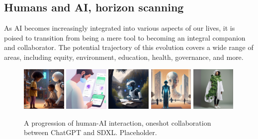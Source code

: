 \subsection{Humans and AI, horizon scanning}
As AI becomes increasingly integrated into various aspects of our lives, it is poised to transition from being a mere tool to becoming an integral companion and collaborator. The potential trajectory of this evolution covers a wide range of areas, including equity, environment, education, health, governance, and more.
\begin{figure}[ht]
\centering
\includegraphics[width=0.19\textwidth]{images/base_output_00002_.png}
\hfill
\includegraphics[width=0.19\textwidth]{images/base_output_00003_.png}
\hfill
\includegraphics[width=0.19\textwidth]{images/base_output_00005_.png}
\hfill
\includegraphics[width=0.19\textwidth]{images/base_output_00006_.png}
\hfill
\includegraphics[width=0.19\textwidth]{images/base_output_00007_.png}
\caption{A progression of human-AI interaction, oneshot collaboration between ChatGPT and SDXL. Placeholder.}
\end{figure}

